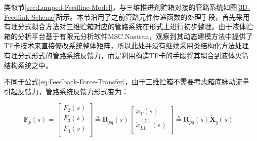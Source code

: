 \begin{figwindow}
类似节\ref{sec:Lumped-Feedline-Model}，与三维推进剂贮箱对接的管路系统如图\ref{3D-Feedlink-Scheme}所示。本节沿用了之前管路元件传递函数的处理手段，首先采用有理分式拟合方法对三维贮箱对应的管路系统在形式上进行初步整理。由于液体贮箱的分析平台基于有限元分析软件MSC.Nastran，观察到其动态建模方法中提供了TF卡技术来直接修改系统整体矩阵，所以此处并没有继续采用类结构化方法处理有理分式形式的管路系统反馈力，而是利用构造TF卡的手段将其耦合到液体火箭结构系统之中。

\makebox[2\Han]{}不同于公式\eqref{eq:Feedback-Force-Transfer}，由于三维贮箱不需要考虑箱底脉动流量引起反馈力，管路系统反馈力形式变为：
\protect\phantom{占座 占座 占座 占座 占座 占座 占座 占座 }

\end{figwindow}

\begin{equation}
	\label{eq:3D-Feedback-Force-Transfer}
	\boldsymbol{F}_p(s)=\left[ \begin{matrix}
	   F_2(s)  \\
	   F_3(s)  \\
	   F_4(s)  \\
	\end{matrix} \right]  \triangleq \boldsymbol{R}_{pq}(s)\left[ \begin{matrix}
	   \dot{x}_T(s)  \\
	   \dot{x}_{L1}^{(5)}(s)  \\
	\end{matrix} \right] \triangleq \boldsymbol{R}_{pq}(s)\boldsymbol{\dot{X}}_q(s)
\end{equation}


